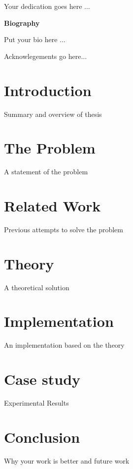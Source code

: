 \documentclass[11pt]{ncsuthesis4}
\begin{document}

\maketitle

\begin{frontmatter}

\begin{dedication}
\begin{center}
\null\vfil
Your dedication goes here $\ldots$
\vfil\null
\end{center}
\end{dedication}

\begin{center}
\begin{large}
\textbf{Biography}
\end{large}
\end{center}
Put your bio here ...

\begin{acknowledgements}
Acknowlegements go here...

\end{acknowledgements}

\tableofcontents
\listoffigures
\listoftables

\end{frontmatter}

\chapter{Introduction}

Summary and overview of thesis

\chapter{The Problem}

A statement of the problem

\chapter{Related Work}

Previous attempts to solve the problem

\chapter{Theory}

A theoretical solution

\chapter{Implementation}

An implementation based on the theory

\chapter{Case study}

Experimental Results~\cite{mlton01}

\chapter{Conclusion}

Why your work is better and future work~\cite{am91}





\end{document}
